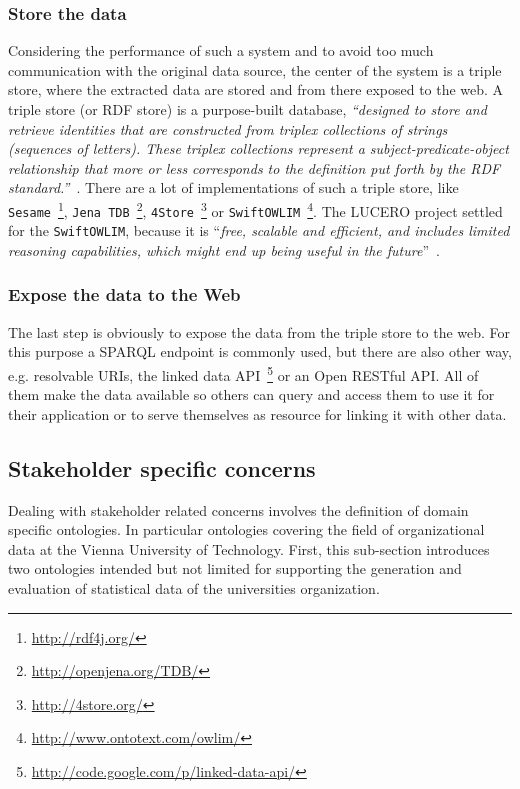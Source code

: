 \documentclass{article}
\begin{document}
\subsubsection{Store the data}
\label{subsubsec:store}
Considering the performance of such a system and to avoid too much communication with the original data source, the center of the system is a triple store, where the extracted data are stored and from there exposed to the web. A triple store (or RDF store) is a purpose-built database, \textit{``designed to store and retrieve identities that are constructed from triplex collections of strings (sequences of letters). These triplex collections represent a subject-predicate-object relationship that more or less corresponds to the definition put forth by the RDF standard.''}~\citet{url:triplestore}. There are a lot of implementations of such a triple store, like 
\texttt{Sesame}~\footnote{\url{http://rdf4j.org/}}, 
\texttt{Jena TDB}~\footnote{\url{http://openjena.org/TDB/}}, 
\texttt{4Store}~\footnote{\url{http://4store.org/}} or 
\texttt{SwiftOWLIM}~\footnote{\url{http://www.ontotext.com/owlim/}}. The LUCERO project settled for the \texttt{SwiftOWLIM}, because it is ``\textit{free, scalable and efficient, and includes limited reasoning capabilities, which might end up being useful in the future}''~\citet{url:lucero-tabloid}.

\subsubsection{Expose the data to the Web}
\label{subsubsec:provision}
The last step is obviously to expose the data from the triple store to the web. For this purpose a SPARQL endpoint is commonly used, but there are also other way, e.g. resolvable URIs, the linked data API~\footnote{\url{http://code.google.com/p/linked-data-api/}} or an Open RESTful API. All of them make the data available so others can query and access them to use it for their application or to serve themselves as resource for linking it with other data.

\subsection{Stakeholder specific concerns}
\label{sec:ontologies}
Dealing with stakeholder related concerns involves the definition of domain specific ontologies. In particular ontologies covering the field of organizational data at the Vienna University of Technology. First, this sub-section introduces two ontologies intended but not limited for supporting the generation and evaluation of statistical data of the universities organization. 
\end{document}
